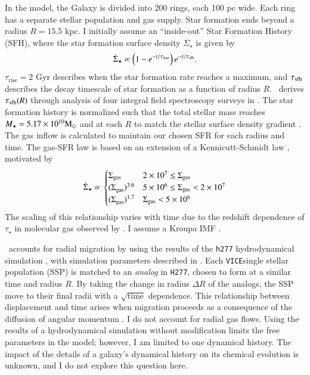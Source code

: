 \documentclass[12pt,oneside]{report}
\newcommand{\JJ}{\citetalias{james+21}}
\newcommand{\VICE}{\texttt{VICE}}
\begin{document}
In the model, the Galaxy is divided into 200 rings, each 100 pc wide. Each ring has a separate stellar population and gas supply. Star formation ends beyond a radius $R=15.5$ kpc. I initially assume an ``inside-out'' Star Formation History (SFH), where the star formation surface density $\Sigma_\star$ is given by 
\begin{equation}
    \dot{\Sigma}_\star \propto \left(1-e^{-t/\tau_{\rm rise}}\right) e^{-t/\tau_{\rm sfh}}.
\end{equation}
$\tau_\text{rise}=2$ Gyr describes when the star formation rate reaches a maximum, and $\tau_{\rm sfh}$ describes the decay timescale of star formation as a function of radius $R$. \JJ~derives $\tau_{\rm sfh}(R)$ through analysis of four integral field spectroscopy surveys in \cite{sanches20}. The star formation history is normalized such that the total stellar mass reaches $M_\star=5.17\times10^{10} {\rm M}_\odot$ \citep{LM15} and at each $R$ to match the stellar surface density gradient \citep{BHG16}.
The gas inflow is calculated to maintain our chosen SFR for each radius and time. The gas-SFR law is based on an extension of a Kennicutt-Schmidt law \citep{kennicutt98}, motivated by 
\begin{equation}
\dot{\Sigma}_{\star} \propto \\
\begin{cases}
    {\Sigma}_{\rm gas} & 2\times 10^7 \leq \Sigma_{\rm gas} \\ 
    {(\Sigma}_{\rm gas})^{3.6} & 5\times 10^6 \leq \Sigma_{\rm gas} < 2\times10^7 \\ 
    {(\Sigma}_{\rm gas})^{1.7} & \Sigma_{\rm gas} < 5\times10^6 \\ 
\end{cases}
\end{equation}
The scaling of this relationship varies with time due to the redshift dependence of $\tau_\star$ in molecular gas observed by \citet{tacconi18}. I assume a Kroupa IMF \cite{kroupa01}.


\JJ\ accounts for radial migration by using the results of the \texttt{h277} hydrodynamical simulation \citep{christensen12, zolotov12, loebman12, BZ14}, with simulation parameters described in \citet{bird+21}. Each \VICE single stellar population (SSP) is matched to an \textit{analog} in \texttt{H277}, chosen to form at a similar time and radius $R$. By taking the change in radius $\Delta R$ of the analogs, the SSP move to their final radii with a $\sqrt{\text{time}}$ dependence.
This relationship between displacement and time arises when migration proceeds as a consequence of the diffusion of angular momentum \citep{frankel18, frankel20}.
I do not account for radial gas flows.
Using the results of a hydrodynamical simulation without modification limits the free parameters in the model; however, I am limited to one dynamical history. The impact of the details of a galaxy's dynamical history on its chemical evolution is unknown, and I do not explore this question here.
\end{document}

